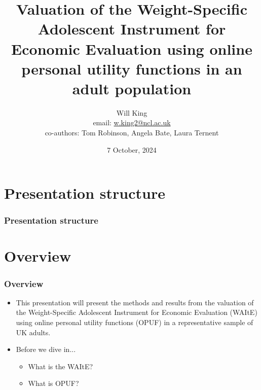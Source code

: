 \documentclass[t,compress,9pt,aspectratio=169]{beamer}
\title[NIHR ARC North East and North Cumbria]{\textbf{Valuation of the Weight-Specific Adolescent Instrument for Economic Evaluation using online personal utility functions in an adult population}}
\subtitle{}
\author[King, Will]{Will King \\ \small email: \href{mailto:w.king2@ncl.ac.uk}{w.king2@ncl.ac.uk} \\ \small co-authors: Tom Robinson, Angela Bate, Laura Ternent}
\institute{NIHR ARC North East and
North Cumbria, \\
Newcastle University}
\date[7 October]{7 October, 2024}
\begin{document}
\begin{frame}[plain]
\maketitle
\end{frame}



\section*{Presentation structure}
\begin{frame}
\tableofcontents
\frametitle{Presentation structure}
\end{frame}


\section{Overview}
\begin{frame}[fragile]
\frametitle{Overview}
\begin{itemize}
  \item This presentation will present the methods and results from the valuation of the Weight-Specific Adolescent Instrument for Economic Evaluation (WAItE) using online personal utility functions (OPUF) in a representative sample of UK adults.
  \item Before we dive in...
  \begin{itemize}
      \item What is the WAItE?
      \item What is OPUF?
  \end{itemize}
\end{itemize}
\end{frame}

\end{document}
